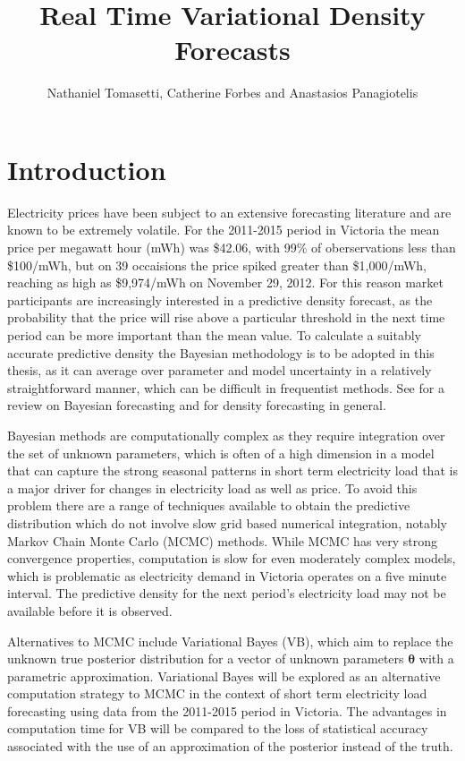 \documentclass[12pt,a4paper]{article}%
\title{Real Time Variational Density Forecasts}
\author{Nathaniel Tomasetti, Catherine Forbes and Anastasios Panagiotelis}
\numberwithin{equation}{section}
\begin{document}
\maketitle
\tableofcontents
\section{Introduction} 

Electricity prices have been subject to an extensive forecasting literature and are known to be extremely volatile. For the 2011-2015 period in Victoria the mean price per megawatt hour (mWh) was \$42.06, with 99\% of oberservations less than \$100/mWh, but on 39 occaisions the price spiked greater than \$1,000/mWh, reaching as high as \$9,974/mWh on November 29, 2012. For this reason market participants are increasingly interested in a predictive density forecast, as the probability that the price will rise above a particular threshold in the next time period can be more important than the mean value. To calculate a suitably accurate predictive density the Bayesian methodology is to be adopted in this thesis, as it can average over parameter and model uncertainty in a relatively straightforward manner, which can be difficult in frequentist methods. See \citet{Geweke2006} for a review on Bayesian forecasting and \citet{Gneiting2014} for density forecasting in general. 

Bayesian methods are computationally complex as they require integration over the set of unknown parameters, which is often of a high dimension in a model that can capture the strong seasonal patterns in short term electricity load \citep{Taylor2003} that is a major driver for changes in electricity load as well as price. To avoid this problem there are a range of techniques available to obtain the predictive distribution which do not involve slow grid based numerical integration, notably Markov Chain Monte Carlo (MCMC) methods. While MCMC has very strong convergence properties, computation is slow for even moderately complex models, which is problematic as electricity demand in Victoria operates on a five minute interval. The predictive density for the next period's electricity load may not be available before it is observed.

Alternatives to MCMC include Variational Bayes (VB), which aim to replace the unknown true posterior distribution for a vector of unknown parameters $\boldsymbol{\theta}$ with a parametric approximation. Variational Bayes will be explored as an alternative computation strategy to MCMC in the context of short term electricity load forecasting using data from the 2011-2015 period in Victoria. The advantages in computation time for VB will be compared to the loss of statistical accuracy associated with the use of an approximation of the posterior instead of the truth. 
\end{document}
